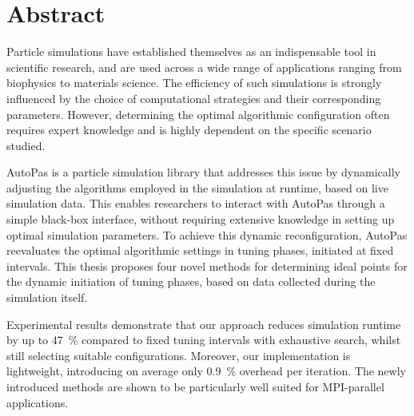 \thispagestyle{plain}

\chapter*{Abstract}

Particle simulations have established themselves as an indispensable tool in scientific research, and are used across a wide range of applications ranging from biophysics to materials science. The efficiency of such simulations is strongly influenced by the choice of computational strategies and their corresponding parameters. However, determining the optimal algorithmic configuration often requires expert knowledge and is highly dependent on the specific scenario studied.

AutoPas is a particle simulation library that addresses this issue by dynamically adjusting the algorithms employed in the simulation at runtime, based on live simulation data. This enables researchers to interact with AutoPas through a simple black-box interface, without requiring extensive knowledge in setting up optimal simulation parameters. To achieve this dynamic reconfiguration, AutoPas reevaluates the optimal algorithmic settings in tuning phases, initiated at fixed intervals. This thesis proposes four novel methods for determining ideal points for the dynamic initiation of tuning phases, based on data collected during the simulation itself.

Experimental results demonstrate that our approach reduces simulation runtime by up to \qty{47}{\percent} compared to fixed tuning intervals with exhaustive search, whilst still selecting suitable configurations. Moreover, our implementation is lightweight, introducing on average only \qty{0.9}{\percent} overhead per iteration. The newly introduced methods are shown to be particularly well suited for MPI-parallel applications.


\MediaOptionLogicBlank

